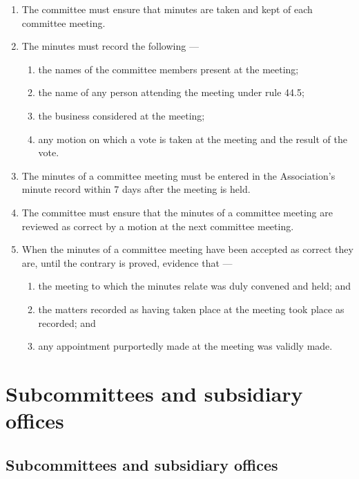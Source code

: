 \documentclass[../constitution.tex]{subfiles}
\begin{document}
\begin{enumerate}

\item The committee must ensure that minutes are taken and kept of each committee meeting.
\item The minutes must record the following ---

  \begin{enumerate}
  
  \item the names of the committee members present at the meeting;
  \item the name of any person attending the meeting under rule 44.5;
  \item the business considered at the meeting;
  \item any motion on which a vote is taken at the meeting and the result of the vote.
  \end{enumerate}
\item The minutes of a committee meeting must be entered in the Association's minute record within 7 days after the meeting is held.
\item The committee must ensure that the minutes of a committee meeting are reviewed as correct by a motion at the next committee meeting.
\item When the minutes of a committee meeting have been accepted as correct they are, until the contrary is proved, evidence that ---

  \begin{enumerate}
  
  \item the meeting to which the minutes relate was duly convened and held; and
  \item the matters recorded as having taken place at the meeting took place as recorded; and
  \item any appointment purportedly made at the meeting was validly made.
  \end{enumerate}
\end{enumerate}

\hypertarget{division-5-subcommittees-and-subsidiary-offices}{%
\section{Subcommittees and subsidiary offices}\label{division-5-subcommittees-and-subsidiary-offices}}

\hypertarget{subcommittees-and-subsidiary-offices}{%
\subsection{Subcommittees and subsidiary offices}\label{subcommittees-and-subsidiary-offices}}
\end{document}
